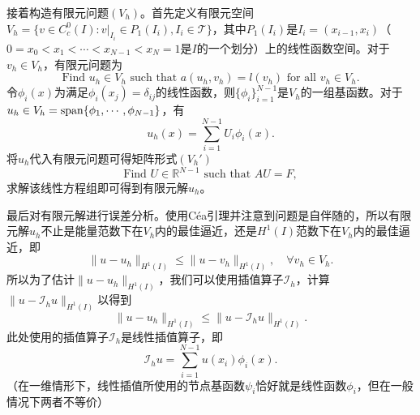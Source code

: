 \documentclass[a4paper,10pt]{ctexart}
\begin{document}
接着构造有限元问题$ (V_h) $。首先定义有限元空间$ V_h = \{v\in C_c^0(I):v|_{I_i}\in P_1(I_i),I_i\in \mathcal{T}\} $，其中$ P_1(I_i) $是$ I_i=(x_{i-1},x_i) $（$ 0=x_0<x_1<\cdots <x_{N-1}<x_N=1 $是$ I $的一个划分）上的线性函数空间。对于$ v_h\in V_h $，有限元问题为
\begin{equation}
    \text{Find } u_h\in V_h \text{ such that } a(u_h,v_h) = l(v_h) \text{ for all } v_h\in V_h.
\end{equation}
令$ \phi_i(x) $为满足$ \phi_i(x_j) = \delta_{ij} $的线性函数，则$ \{\phi_i\}_{i=1}^{N-1} $是$ V_h $的一组基函数。对于$ u_h\in V_h = {\rm span}\{\phi_1,\cdots ,\phi_{N-1}\} $，有
\begin{equation}
    u_h(x) = \sum_{i=1}^{N-1} U_i\phi_i(x).
\end{equation}
将$ u_h $代入有限元问题可得矩阵形式$ (V_h') $
\begin{equation}
    \text{Find } U \in \mathbb{R}^{N-1} \text{ such that } AU = F,
\end{equation}
求解该线性方程组即可得到有限元解$ u_h $。

最后对有限元解进行误差分析。使用Céa引理并注意到问题是自伴随的，所以有限元解$ u_h $不止是能量范数下在$ V_h $内的最佳逼近，还是$ H^1(I) $范数下在$ V_h $内的最佳逼近，即
\begin{equation}
    \| u-u_h \|_{H^1(I)} \leqslant \| u-v_h \|_{H^1(I)},\quad \forall v_h\in V_h.
\end{equation}
所以为了估计$ \| u-u_h \|_{H^1(I)} $，我们可以使用插值算子$ \mathcal{I}_h $，计算$ \| u-\mathcal{I}_h u \|_{H^1(I)} $以得到
\begin{equation}
    \| u-u_h \|_{H^1(I)} \leqslant \| u-\mathcal{I}_h u \|_{H^1(I)}.
\end{equation}
此处使用的插值算子$ \mathcal{I}_h $是线性插值算子，即
\begin{equation}
    \mathcal{I}_h u = \sum_{i=1}^{N-1} u(x_i)\phi_i(x).
\end{equation}
（在一维情形下，线性插值所使用的节点基函数$ \psi_i $恰好就是线性函数$ \phi_i $，但在一般情况下两者不等价）
\end{document}
